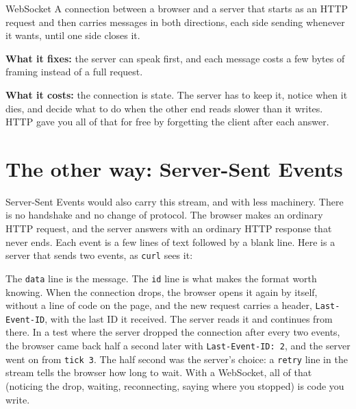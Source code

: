 \begin{concept}{WebSocket}
A connection between a browser and a server that starts as an HTTP request and
then carries messages in both directions, each side sending whenever it wants,
until one side closes it.

\textbf{What it fixes:} the server can speak first, and each message costs a
few bytes of framing instead of a full request.

\textbf{What it costs:} the connection is state. The server has to keep it,
notice when it dies, and decide what to do when the other end reads slower
than it writes. HTTP gave you all of that for free by forgetting the client
after each answer.
\end{concept}

\section{The other way: Server-Sent Events}

Server-Sent Events would also carry this stream, and with less machinery. There
is no handshake and no change of protocol. The browser makes an ordinary HTTP
request, and the server answers with an ordinary HTTP response that never ends.
Each event is a few lines of text followed by a blank line. Here is a server
that sends two events, as \texttt{curl} sees it:


The \texttt{data} line is the message. The \texttt{id} line is what makes the
format worth knowing. When the connection drops, the browser opens it again by
itself, without a line of code on the page, and the new request carries a
header, \texttt{Last-Event-ID}, with the last ID it received. The server reads
it and continues from there. In a test where the server dropped the connection
after every two events, the browser came back half a second later with
\texttt{Last-Event-ID: 2}, and the server went on from \texttt{tick 3}. The
half second was the server's choice: a \texttt{retry} line in the stream tells
the browser how long to wait. With a WebSocket, all of that (noticing the drop,
waiting, reconnecting, saying where you stopped) is code you write.


